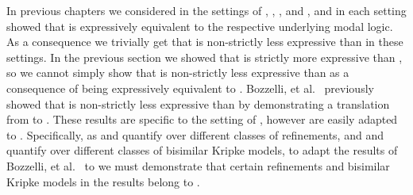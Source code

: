 In previous chapters we considered \logicRml{} in the settings of \classK{}, \classKFF{}, \classKD{}, and \classS{}, and in each setting showed that \logicRml{} is expressively equivalent to the respective underlying modal logic.
As a consequence we trivially get that \logicRml{} is non-strictly less expressive than \logicBqml{} in these settings.
In the previous section we showed that \logicRmlKF{} is strictly more expressive than \logicKF{}, so we cannot simply show that \logicRmlKF{} is non-strictly less expressive than \logicBqmlKF{} as a consequence of \logicRmlKF{} being expressively equivalent to \logicKF{}.
Bozzelli, et al.~\cite{bozzelli:2014b} previously showed that \logicRmlK{} is non-strictly less expressive than \logicBqmlK{} by demonstrating a translation from \langRml{} to \langBqml{}.
These results are specific to the setting of \classK{}, however are easily adapted to \classKF{}.
Specifically, as \logicRmlK{} and \logicRmlKF{} quantify over different classes of refinements, and \logicBqmlK{} and \logicBqmlKF{} quantify over different classes of bisimilar Kripke models, to adapt the results of Bozzelli, et al.~\cite{bozzelli:2014b} to \logicRmlKF{} we must demonstrate that certain refinements and bisimilar Kripke models in the results belong to \classKF{}.

